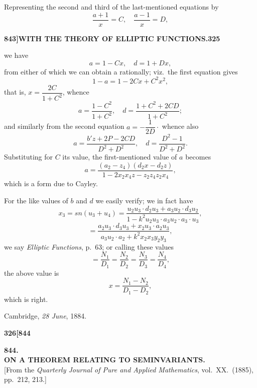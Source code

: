 \documentclass[12pt,a4paper]{article}
\theoremstyle{definition}
\begin{document}
Representing the second and third of the last-mentioned equations by
\[
\frac{a + 1}{x} = C, \quad \frac{a - 1}{x} = D,
\]

\newpage
\setcounter{page}{325}

\noindent\textbf{843]}\hfill\textbf{WITH THE THEORY OF ELLIPTIC FUNCTIONS.}\hfill\textbf{325}

\bigskip

\noindent we have
\[
a = 1 - Cx, \quad d = 1 + Dx,
\]
from either of which we can obtain a rationally; viz.\ the first equation gives
\[
1 - a = 1 - 2Cx + C^2x^2,
\]
that is, $x = \dfrac{2C}{1 + C^2}$, whence
\[
a = \frac{1 - C^2}{1 + C^2}, \quad d = \frac{1 + C^2 + 2CD}{1 + C^2};
\]
and similarly from the second equation $a = -\dfrac{1}{2D}\cdot$ whence also
\[
a = \frac{b'z + 2P - 2CD}{D^2 + D^2}, \quad d = \frac{D^2 - 1}{D^2 + D^2}.
\]
Substituting for $C$ its value, the first-mentioned value of $a$ becomes
\[
a = \frac{(a_2 - z_4)(d_2x - d_2z)}{1 - 2x_2x_4z - z_2z_4z_2x_4},
\]
which is a form due to Cayley.

For the like values of $b$ and $d$ we easily verify; we in fact have
\[
x_3 = sn(u_3 + u_4) = \frac{u_2u_3 \cdot d_2u_3 + a_3u_2 \cdot d_3u_2}{1 - k^2u_2u_3 \cdot a_3u_2 \cdot a_3 \cdot u_3},
\]
\[
= \frac{a_2u_3 \cdot d_3u_3 + x_2u_3 \cdot a_2u_3}{a_3u_2 \cdot a_2 + k^2x_2x_3y_2y_3},
\]
we say \textit{Elliptic Functions}, p.\ 63; or calling these values
\[
= \frac{N_1}{D_1} = \frac{N_2}{D_2} = \frac{N_3}{D_3} = \frac{N_4}{D_4},
\]
the above value is
\[
x = \frac{N_1 - N_2}{D_1 - D_2},
\]
which is right.

\smallskip
\hfill Cambridge, \textit{28 June}, 1884.

\vspace{2em}


\newpage
\setcounter{page}{326}

\noindent\textbf{326}\hfill\textbf{[844}

\bigskip

\begin{center}
{\Large\textbf{844.}}\\[1em]
{\large\textbf{ON A THEOREM RELATING TO SEMINVARIANTS.}}\\[1em]
[From the \textit{Quarterly Journal of Pure and Applied Mathematics}, vol.\ XX.\ (1885), pp.\ 212, 213.]
\end{center}
\end{document}
